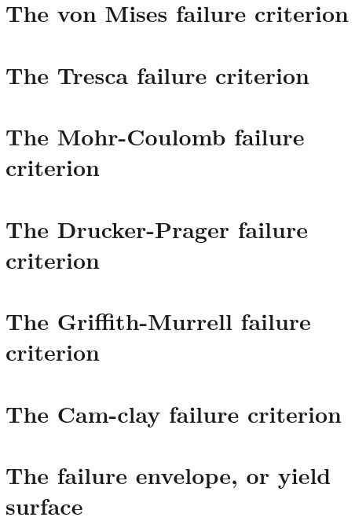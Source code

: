 \section{The von Mises failure criterion}\label{sec:vMcriterion}


\section{The Tresca failure criterion}\label{sec:trcriterion}


\section{The Mohr-Coulomb failure criterion}\label{sec:mccriterion}


\section{The Drucker-Prager failure criterion \label{sec:dpcriterion}}


\section{The Griffith-Murrell failure criterion}


\section{The Cam-clay failure criterion}


\section{The failure envelope, or yield surface \label{ss:envelope}}


